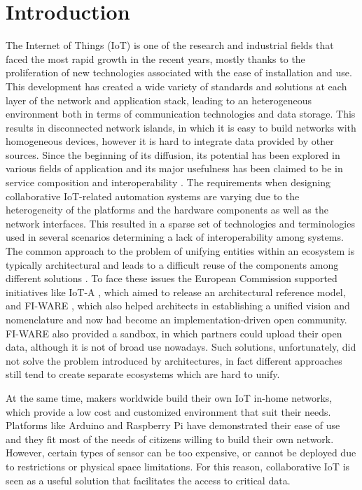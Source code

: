 \section{Introduction}
The Internet of Things (IoT) is one of the research and industrial fields that faced the most rapid growth in the recent years, mostly thanks to the proliferation of new technologies associated with the ease of installation and use.
This development has created a wide variety of standards and solutions at each layer of the network and application stack, leading to an heterogeneous environment both in terms of communication technologies and data storage.
This results in disconnected network islands, in which it is easy to build networks with homogeneous devices, however it is hard to integrate data provided by other sources.
Since the beginning of its diffusion, its potential has been explored in various fields of application and its major usefulness has been claimed to be in service composition and interoperability \cite{atzori2010internet}. The requirements when designing collaborative IoT-related automation systems are varying due to the heterogeneity of the platforms and the hardware components as well as the network interfaces.
This resulted in a sparse set of technologies and terminologies used in several scenarios determining a lack of interoperability among systems.
The common approach to the problem of unifying entities within an ecosystem is typically architectural and leads to a difficult reuse of the components among different solutions \cite{krco2014designing}.
To face these issues the European Commission supported initiatives like IoT-A \cite{iot-a}, which aimed to release an architectural reference model, and FI-WARE \cite{fiware}, which also helped architects in establishing a unified vision and nomenclature and now had become an implementation-driven open community.
FI-WARE also provided a sandbox, in which partners could upload their open data, although it is not of broad use nowadays.
Such solutions, unfortunately, did not solve the problem introduced by architectures, in fact different approaches still tend to create separate ecosystems which are hard to unify.

At the same time, makers worldwide build their own IoT in-home networks, which provide a low cost and customized environment that suit their needs.
Platforms like Arduino \cite{arduino} and Raspberry Pi \cite{raspberry} have demonstrated their ease of use and they fit most of the needs of citizens willing to build their own network.
However, certain types of sensor can be too expensive, or cannot be deployed due to restrictions or physical space limitations.
For this reason, collaborative IoT is seen as a useful solution that facilitates the access to critical data.
\\


